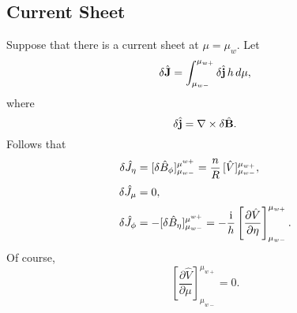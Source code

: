 \documentclass[12pt,prb,aps,notitlepage]{revtex4-1}
\begin{document}
\subsection{Current Sheet}
Suppose that there is a current sheet at $\mu=\mu_w$. Let
\begin{equation}
\delta\hat{\bf J} = \int_{\mu_{w-}}^{\mu_{w+}}\delta\hat{\bf j}\,h\,d\mu,
\end{equation}
where
\begin{equation}
\delta\hat{\bf j} = \nabla\times \delta\hat{\bf B}.
\end{equation}
Follows that
\begin{align}
\delta\hat{J}_\eta &= [\delta \hat{B}_\phi]_{\mu_{w-}}^{\mu^{w+}} = \frac{n}{R}\,[\hat{V}]_{\mu_{w-}}^{\mu_{w+}},\\[0.5ex]
\delta\hat{J}_\mu &=0,\\[0.5ex]
\delta\hat{J}_\phi &=  -[\delta \hat{B}_\eta]_{\mu_{w-}}^{\mu^{w+}} =- \frac{{\rm i}}{h}\left[\frac{\partial\hat{V}}{\partial\eta}\right]_{\mu_{w-}}^{\mu_{w+}}.
\end{align}
Of course,
\begin{equation}
\left[\frac{\partial\hat{V}}{\partial\mu}\right]_{\mu_{w-}}^{\mu_{w+}}=0.
\end{equation}
\end{document}
